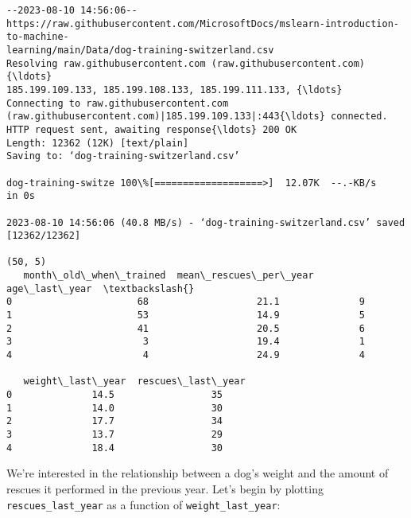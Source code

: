 \documentclass[11pt]{article}
\begin{document}
\begin{Verbatim}[commandchars=\\\{\}]
--2023-08-10 14:56:06--
https://raw.githubusercontent.com/MicrosoftDocs/mslearn-introduction-to-machine-
learning/main/Data/dog-training-switzerland.csv
Resolving raw.githubusercontent.com (raw.githubusercontent.com){\ldots}
185.199.109.133, 185.199.108.133, 185.199.111.133, {\ldots}
Connecting to raw.githubusercontent.com
(raw.githubusercontent.com)|185.199.109.133|:443{\ldots} connected.
HTTP request sent, awaiting response{\ldots} 200 OK
Length: 12362 (12K) [text/plain]
Saving to: ‘dog-training-switzerland.csv’

dog-training-switze 100\%[===================>]  12.07K  --.-KB/s    in 0s

2023-08-10 14:56:06 (40.8 MB/s) - ‘dog-training-switzerland.csv’ saved
[12362/12362]

(50, 5)
   month\_old\_when\_trained  mean\_rescues\_per\_year  age\_last\_year  \textbackslash{}
0                      68                   21.1              9
1                      53                   14.9              5
2                      41                   20.5              6
3                       3                   19.4              1
4                       4                   24.9              4

   weight\_last\_year  rescues\_last\_year
0              14.5                 35
1              14.0                 30
2              17.7                 34
3              13.7                 29
4              18.4                 30
    \end{Verbatim}

    We're interested in the relationship between a dog's weight and the
amount of rescues it performed in the previous year. Let's begin by
plotting \texttt{rescues\_last\_year} as a function of
\texttt{weight\_last\_year}:
\end{document}
